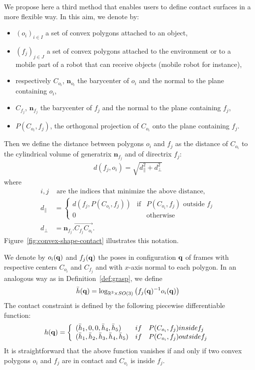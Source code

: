 We propose here a third method that enables users to define contact surfaces in a more flexible way. In this aim, we denote by:
\begin{itemize}
\item $(o_i)_{i\in I}$ a set of convex polygons attached to an object,
\item $(f_j)_{j\in J}$ a set of convex polygons attached to the environment or to a mobile part of a robot that can receive objects (mobile robot for instance),
\item respectively $C_{o_i}$, $\mathbf{n}_{o_i}$ the barycenter of $o_i$ and the normal to the plane containing $o_i$,
\item $C_{f_j}$, $\mathbf{n}_{f_j}$ the barycenter of $f_j$ and the normal to the plane containing $f_j$,
\item $P(C_{o_i},f_j)$, the orthogonal projection of $C_{o_i}$ onto the plane containing $f_j$.
\end{itemize}
Then we define the distance between polygons $o_i$ and $f_j$ as the distance of $C_{o_i}$ to the cylindrical volume of generatrix $\mathbf{n}_{f_j}$ and of directrix $f_j$:
\begin{align}\label{eq:contact-distance}
  d(f_j,o_i) = \sqrt{d_{\parallel}^2 + d_{\perp}^2}
\end{align}
where
\begin{align*}
  i,j & \mbox{ are the indices that minimize the above distance,}\\
d_{\parallel} &= \left\{\begin{array}{lll} d(f_j,P(C_{o_i},f_j))&\mbox{if}& P(C_{o_i},f_j)\mbox{ outside } f_j\\
0 & & \mbox{otherwise}
\end{array}\right. \\
d_{\perp} &= \mathbf{n}_{f_j}.\vec{C_{f_j}C_{o_i}}.
\end{align*}
Figure~\ref{fig:convex-shape-contact} illustrates this notation.

We denote by $o_i(\mathbf{q})$ and $f_j(\mathbf{q})$ the poses in configuration $\mathbf{q}$ of frames with respective centers $C_{o_i}$ and $C_{f_j}$ and with $x$-axis normal to each polygon. In an analogous way as in Definition~\ref{def:grasp}, we define
\begin{equation}\label{eq:convex-shape-contact-hbar}
\bar{h}(\conf) = \log_{\reals^3\times SO(3)} \left(f_{j}(\conf)^{-1}o_i(\conf)\right)
\end{equation}
The contact constraint is defined by the following piecewise differentiable function:
\begin{equation}\label{eq:convex-shape-contact}
h(\conf) = \left\{\begin{array}{lll}(\bar{h}_1,0,0,\bar{h}_4,\bar{h}_5)&
\mbox{if} & P(C_{o_i},f_j)\mbox{ inside } f_j\\
(\bar{h}_1,\bar{h}_2,\bar{h}_3,\bar{h}_4,\bar{h}_5)&
\mbox{if} & P(C_{o_i},f_j)\mbox{ outside } f_j\end{array}\right.
\end{equation}
It is straightforward that the above function vanishes if and only if two convex polygons $o_i$ and $f_j$ are in contact and $C_{o_i}$ is inside $f_j$.

